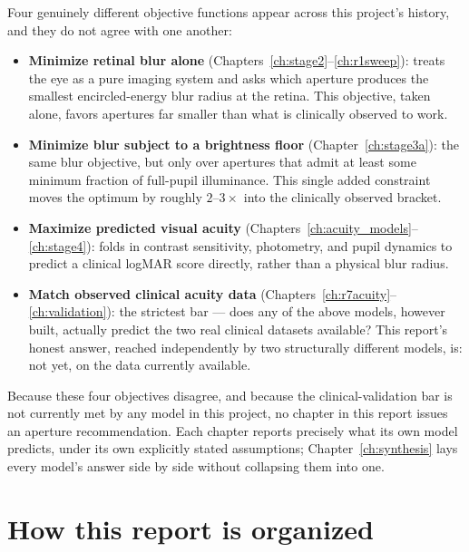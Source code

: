 Four genuinely different objective functions appear across this project's history,
and they do not agree with one another:

\begin{itemize}
\item \textbf{Minimize retinal blur alone} (Chapters~\ref{ch:stage2}--\ref{ch:r1sweep}):
  treats the eye as a pure imaging system and asks which aperture produces the
  smallest encircled-energy blur radius at the retina. This objective, taken alone,
  favors apertures far smaller than what is clinically observed to work.
\item \textbf{Minimize blur subject to a brightness floor}
  (Chapter~\ref{ch:stage3a}): the same blur objective, but only over apertures that
  admit at least some minimum fraction of full-pupil illuminance. This single added
  constraint moves the optimum by roughly $2$--$3\times$ into the clinically observed
  bracket.
\item \textbf{Maximize predicted visual acuity} (Chapters~\ref{ch:acuity_models}--\ref{ch:stage4}):
  folds in contrast sensitivity, photometry, and pupil dynamics to predict a clinical
  logMAR score directly, rather than a physical blur radius.
\item \textbf{Match observed clinical acuity data} (Chapters~\ref{ch:r7acuity}--\ref{ch:validation}):
  the strictest bar --- does any of the above models, however built, actually predict
  the two real clinical datasets available? This report's honest answer, reached
  independently by two structurally different models, is: not yet, on the data
  currently available.
\end{itemize}

Because these four objectives disagree, and because the clinical-validation bar is not
currently met by any model in this project, no chapter in this report issues an
aperture recommendation. Each chapter reports precisely what its own model predicts,
under its own explicitly stated assumptions; Chapter~\ref{ch:synthesis} lays every
model's answer side by side without collapsing them into one.

\section{How this report is organized}

